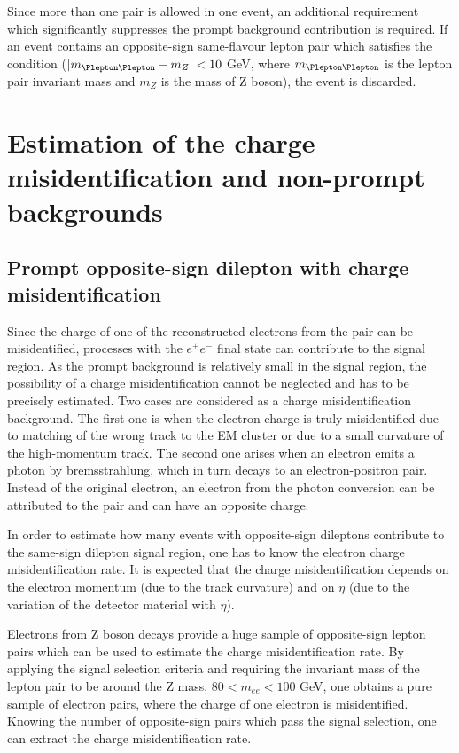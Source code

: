 Since more than one pair is allowed in one event, an additional requirement which significantly suppresses the prompt background contribution is required.
If an event contains an opposite-sign same-flavour lepton pair which satisfies the condition ($|m_{\Plepton\Plepton} - m_{Z}| < 10$ GeV,
where $m_{\Plepton\Plepton}$ is the lepton pair invariant mass and $m_{Z}$ is the mass of Z boson), the event is discarded.

\section{Estimation of the charge misidentification and non-prompt backgrounds}

\subsection{Prompt opposite-sign dilepton with charge misidentification}
\label{subsec:CF_definition}

Since the charge of one of the reconstructed electrons from the pair can be misidentified, 
processes with the $e^{+}e^{-}$ final state can contribute to the signal region.
As the prompt background is relatively small in the signal region, the possibility of a charge misidentification cannot be neglected and has to be precisely estimated. 
Two cases are considered as a charge misidentification background. 
The first one is when the electron charge is truly misidentified due to matching of the wrong track to the EM cluster 
or due to a small curvature of the high-momentum track. 
The second one arises when an electron emits a photon by bremsstrahlung, which in turn decays to an electron-positron pair. 
Instead of the original electron, an electron from the photon conversion can be attributed to the pair and can have an opposite charge.

In order to estimate how many events with opposite-sign dileptons contribute to the same-sign dilepton signal region, 
one has to know the electron charge misidentification rate. It is expected that the charge misidentification depends on the electron momentum (due to the track curvature) 
and on $\eta$ (due to the variation of the detector material with $\eta$).

Electrons from Z boson decays provide a huge sample of opposite-sign lepton pairs which can be used to estimate the charge misidentification rate. 
By applying the signal selection criteria
and requiring the invariant mass of the lepton pair to be around the Z mass, $80 < m_{ee} < 100$ GeV, one obtains a pure
sample of electron pairs, where the charge of one electron is misidentified. Knowing the number of opposite-sign pairs which pass the signal selection, 
one can extract the charge misidentification rate.

